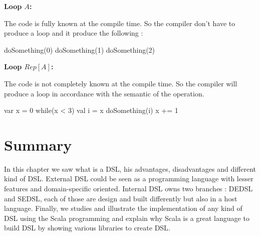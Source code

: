 \textbf{Loop $A$:}

The code  is fully known at the compile time. So
the compiler don't have to produce a loop and it produce the following :
\begin{scalacode}
doSomething(0)
doSomething(1)
doSomething(2)
\end{scalacode}

\textbf{Loop $Rep[A]$:}

The code  is not completely known at
the compile time. So the compiler will produce a loop in accordance with the
semantic of the operation.
\begin{scalacode}
var x = 0
while(x < 3) {
  val i = x
  doSomething(i)
  x += 1
}
\end{scalacode}

\section{Summary}
\label{sec:dsl_summary}

In this chapter we saw what is a \gls{DSL}, his advantages, disadvantages and
different kind of \gls{DSL}. External \gls{DSL} could be seen as a programming
language with lesser features and domain-specific oriented. Internal \gls{DSL}
owns two branches : \gls{DEDSL} and \gls{SEDSL}, each of those are design and
built differently but also in a host language. Finally, we studies and
illustrate the implementation of any kind of \gls{DSL} using the Scala
programming and explain why Scala is a great language to build \gls{DSL} by
showing various libraries to create \gls{DSL}.

